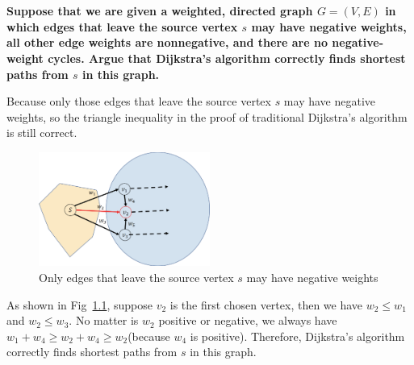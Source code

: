 
\chapter{}
\textbf{
Suppose that we are given a weighted, directed graph $G=(V,E)$ in which edges that leave the source vertex $s$ may have negative weights, all other edge weights are nonnegative, and there are no negative-weight cycles. Argue that Dijkstra's algorithm correctly finds shortest paths from $s$ in this graph.
}

Because only those edges that leave the source vertex $s$ may have negative weights, so the triangle inequality in the proof of traditional Dijkstra's algorithm is still correct.
\begin{figure}[!htbp]
\centering
\includegraphics[width=0.5\textwidth]{figures/2.eps}
\caption{Only edges that leave the source vertex $s$ may have negative weights}\label{fig_2_1}
\end{figure}
 As shown in Fig~\ref{fig_2_1}, suppose $v_2$ is the first chosen vertex, then we have $w_2\leq w_1$ and $w_2\leq w_3$. No matter is $w_2$ positive or negative, we always have $w_1+w_4\geq w_2+w_4\geq w_2$(because $w_4$ is positive). Therefore, Dijkstra's algorithm correctly finds shortest paths from $s$ in this graph.
